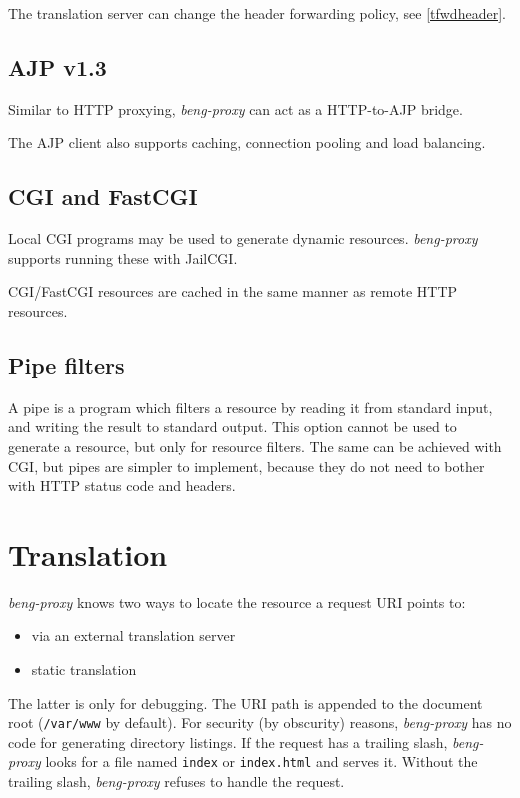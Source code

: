 \documentclass[a4paper,12pt]{article}
\begin{document}
The translation server can change the header forwarding policy, see
\ref{tfwdheader}.

\subsection{AJP v1.3}
\label{ajp}

Similar to HTTP proxying, \emph{beng-proxy} can act as a HTTP-to-AJP
bridge.

The AJP client also supports caching, connection pooling and load
balancing.

\subsection{CGI and FastCGI}
\label{cgi}

Local CGI programs may be used to generate dynamic resources.
\emph{beng-proxy} supports running these with JailCGI.

CGI/FastCGI resources are cached in the same manner as remote HTTP
resources.

\subsection{Pipe filters}
\label{pipe}

A pipe is a program which filters a resource by reading it from
standard input, and writing the result to standard output.  This
option cannot be used to generate a resource, but only for resource
filters.  The same can be achieved with CGI, but pipes are simpler to
implement, because they do not need to bother with HTTP status code
and headers.


\section{Translation}

\emph{beng-proxy} knows two ways to locate the resource a request URI
points to:

\begin{itemize}
\item via an external translation server
\item static translation
\end{itemize}

The latter is only for debugging.  The URI path is appended to the
document root (\texttt{/var/www} by default).  For security (by
obscurity) reasons, \emph{beng-proxy} has no code for generating
directory listings.  If the request has a trailing slash,
\emph{beng-proxy} looks for a file named \texttt{index} or
\texttt{index.html} and serves it.  Without the trailing slash,
\emph{beng-proxy} refuses to handle the request.
\end{document}
